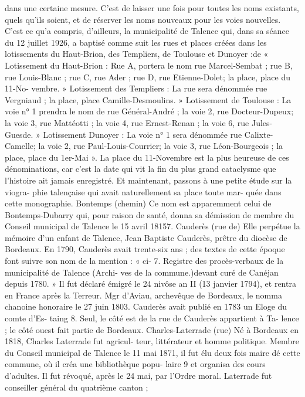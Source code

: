 \documentclass[a4paper,11pt]{book}
\begin{document}
dans une certaine mesure. C'est de laisser une fois pour
toutes les noms existants, quels qu'ils soient, et de réserver
les noms nouveaux pour les voies nouvelles. C'est ce qu'a
compris, d'ailleurs, la municipalité de Talence qui, dans sa
séance du 12 juillet 1926, a baptisé comme suit les rues et
places créées dans les lotissements du Haut-Brion, des
Templiers, de Toulouse et Dunoyer :de
« Lotissement du Haut-Brion : Rue A, portera le nom
rue Marcel-Sembat ; rue B, rue Louis-Blanc ; rue C, rue
Ader ; rue D, rue Etienne-Dolet; la place, place du 11-No-
vembre.
» Lotissement des Templiers : La rue sera dénommée
rue Vergniaud ; la place, place Camille-Desmoulins.
» Lotissement de Toulouse : La voie n° 1 prendra le nom
de rue Général-André ; la voie 2, rue Docteur-Dupeux; la
voie 3, rue Mattéotti ; la voie 4, rue Ernest-Renan ; la voie
6, rue Jules-Guesde.
» Lotissement Dunoyer : La voie n° 1 sera dénommée
rue Calixte-Camelle; la voie 2, rue Paul-Louis-Courrier;
la voie 3, rue Léon-Bourgeois ; la place, place du 1er-Mai ».
La place du 11-Novembre est la plus heureuse de ces
dénominations, car c'est la date qui vit la fin du plus grand
cataclysme que l'histoire ait jamais enregistré.
Et maintenant, passons à une petite étude sur la viogra-
phie talençaise qui avait naturellement sa place toute mar-
quée dans cette monographie.
Bontemps (chemin)
Ce nom est apparemment celui de Bontemps-Dubarry
qui, pour raison de santé, donna sa démission de membre
du Conseil municipal de Talence le 15 avril 18157.
Cauderès (rue de)
Elle perpétue la mémoire d'un enfant de Talence, Jean
Baptiste Cauderès, prêtre du diocèse de Bordeaux.
En 1790, Cauderès avait trente-six ans ; des textes de
cette époque font suivre son nom de la mention : « ci-
7. Registre des procès-verbaux de la municipalité de Talence (Archi-
ves de la commune.)devant curé de Canéjan depuis 1780. » Il fut déclaré émigré
le 24 nivôse an II (13 janvier 1794), et rentra en France
après la Terreur. Mgr d'Aviau, archevêque de Bordeaux,
le nomma chanoine honoraire le 27 juin 1803.
Cauderès avait publié en 1783 un Eloge du comte d'Es-
taing 8.
Seul, le côté est de la rue de Cauderès appartient à Ta-
lence ; le côté ouest fait partie de Bordeaux.
Charles-Laterrade (rue)
Né à Bordeaux en 1818, Charles Laterrade fut agricul-
teur, littérateur et homme politique. Membre du Conseil
municipal de Talence le 11 mai 1871, il fut élu deux fois
maire dé cette commune, où il créa une bibliothèque popu-
laire 9 et organisa des cours d'adultes. Il fut révoqué, après
le 24 mai, par l'Ordre moral.
Laterrade fut conseiller général du quatrième canton ;
\end{document}
